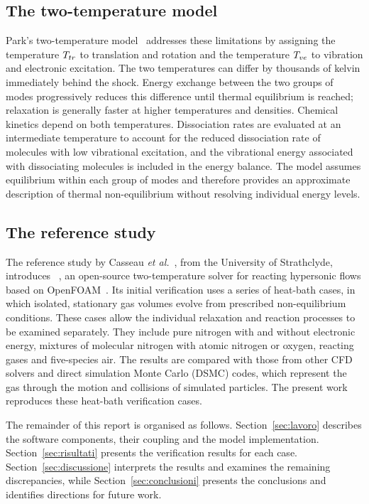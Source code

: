 \subsection{The two-temperature model}
\label{sec:soluzione}

Park's two-temperature model~\cite{park1990,park1993} addresses these
limitations by assigning the temperature $T_{tr}$ to translation and rotation
and the temperature $T_{ve}$ to vibration and electronic excitation. The two
temperatures can differ by thousands of kelvin immediately behind the shock.
Energy exchange between the two groups of modes progressively reduces this
difference until thermal equilibrium is reached; relaxation is generally
faster at higher temperatures and densities. Chemical kinetics depend on both
temperatures. Dissociation rates are evaluated at an intermediate temperature
to account for the reduced dissociation rate of molecules with low vibrational
excitation, and the vibrational energy associated with dissociating molecules
is included in the energy balance. The model assumes equilibrium within each
group of modes and therefore provides an approximate description of thermal
non-equilibrium without resolving individual energy levels.

\subsection{The reference study}
\label{sec:riferimento}

The reference study by Casseau
\textit{et al.}~\cite{casseau2016}, from the University of Strathclyde,
introduces \hyfoam~\cite{hystrath}, an open-source two-temperature solver for
reacting hypersonic flows based on OpenFOAM~\cite{openfoam13}. Its initial
verification uses a series of heat-bath cases, in which isolated, stationary
gas volumes evolve from prescribed non-equilibrium conditions. These cases
allow the individual relaxation and reaction processes to be examined
separately. They include pure nitrogen with and without electronic energy,
mixtures of molecular nitrogen with atomic nitrogen or oxygen, reacting gases
and five-species air. The results are compared with those from other CFD
solvers and direct simulation Monte Carlo (DSMC) codes, which represent the
gas through the motion and collisions of simulated particles. The present
work reproduces these heat-bath verification cases.

The remainder of this report is organised as follows.
Section~\ref{sec:lavoro} describes the software components, their coupling and
the model implementation. Section~\ref{sec:risultati} presents the
verification results for each case. Section~\ref{sec:discussione} interprets
the results and examines the remaining discrepancies, while
Section~\ref{sec:conclusioni} presents the conclusions and identifies
directions for future work.
